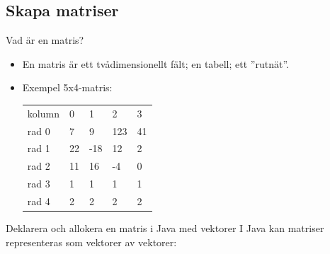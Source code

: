 \documentclass{lecturenotes}
\begin{document}
\subsection{Skapa matriser}

\begin{Slide}{Vad är en matris?}
\begin{itemize}
\item En matris är ett tvådimensionellt fält; en tabell; ett ''rutnät''.
\item Exempel 5x4-matris: \\ \vspace{1em}
\begin{tabular}{lllll}
kolumn                     & 0                       & 1                        & 2                        & 3                       \\ \cline{2-5} 
\multicolumn{1}{l|}{rad 0} & \multicolumn{1}{l|}{7}  & \multicolumn{1}{l|}{9}   & \multicolumn{1}{l|}{123} & \multicolumn{1}{l|}{41} \\ \cline{2-5} 
\multicolumn{1}{l|}{rad 1} & \multicolumn{1}{l|}{22} & \multicolumn{1}{l|}{-18} & \multicolumn{1}{l|}{12}  & \multicolumn{1}{l|}{2}  \\ \cline{2-5} 
\multicolumn{1}{l|}{rad 2} & \multicolumn{1}{l|}{11} & \multicolumn{1}{l|}{16}  & \multicolumn{1}{l|}{-4}  & \multicolumn{1}{l|}{0}  \\ \cline{2-5} 
\multicolumn{1}{l|}{rad 3} & \multicolumn{1}{l|}{1}  & \multicolumn{1}{l|}{1}   & \multicolumn{1}{l|}{1}   & \multicolumn{1}{l|}{1}  \\ \cline{2-5} 
\multicolumn{1}{l|}{rad 4} & \multicolumn{1}{l|}{2}  & \multicolumn{1}{l|}{2}   & \multicolumn{1}{l|}{2}   & \multicolumn{1}{l|}{2}  \\ \cline{2-5} 
\end{tabular}
\end{itemize}
\end{Slide}

\begin{Slide}{Deklarera och allokera en matris i Java med vektorer}
I Java kan matriser representeras som vektorer av vektorer: \\ \vspace{1em}
\end{Slide}
\end{document}
